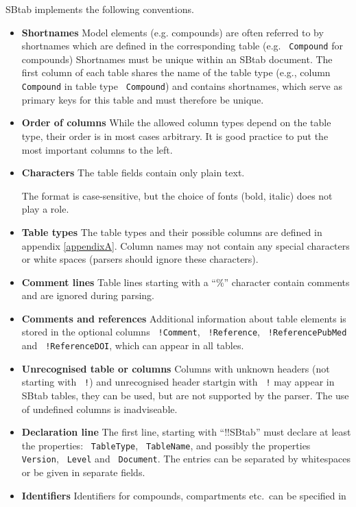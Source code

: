 \documentclass[a4paper]{article}
\newcommand{\la}[1]{}
\newcommand{\tab}[1]{{\texttt{\color{red} #1}}}
\newcommand{\col}[1]{\texttt{\color{blue} #1}}
\begin{document}
SBtab implements the following conventions.
\begin{itemize}
\item \textbf{Shortnames} Model elements (e.g. compounds) are often
  referred to by shortnames which are
  defined in the corresponding table (e.g. \tab{Compound} for
  compounds) \la{or in the table \tab{Name} (for any kind of elements,
  properties, etc).}  Shortnames must be unique within an SBtab
  document.
  The first column of each table shares the name of the table type
  (e.g., column \col{Compound} in table type \tab{Compound}) and
  contains shortnames, which serve as primary keys for this table and must therefore be unique.
\item \textbf{Order of columns} While the allowed column types depend
  on the table type, their order is in most cases arbitrary. It is
  good practice to put the most important columns to the left.  
\item \textbf{Characters} The table fields contain only plain text.
  \la{Special symbols like Greek letters are ignored.} 
  The format is case-sensitive, but the choice of fonts (bold, italic) 
  does not play a role.
\item \textbf{Table types} The table types and their possible columns
  are defined in  appendix \ref{appendixA}.  
  Column names may not contain any special characters or white spaces (parsers should
  ignore these characters). 
\item \textbf{Comment lines} Table lines starting with a ``\%''
  character contain comments and are ignored during parsing.
\item \textbf{Comments and references} Additional information about
  table elements is stored in the optional columns \col{!Comment},
  \col{!Reference}, \col{!ReferencePubMed} and \col{!ReferenceDOI},
  which can appear in all tables.
\item \textbf{Unrecognised table or columns} Columns with unknown
  headers (not starting with \col{!}) and unrecognised header startgin with
  \col{!} may appear in SBtab tables, they can be used, but
  are not supported by the parser. The use of undefined columns is inadviseable.  
\item \textbf{Declaration line} The first line, starting with
  ``!!SBtab'' must declare at least the properties: \tab{TableType},
  \tab{TableName}, and possibly the properties \tab{Version}, \tab{Level} and \tab{Document}. 
  The entries can be separated by whitespaces or be given in separate fields.
\item \textbf{Identifiers}  Identifiers for compounds, compartments etc.~can be specified in

\end{itemize}
\end{document}

